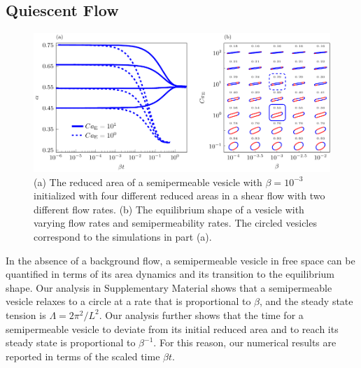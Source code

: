 \documentclass[9pt,twocolumn,twoside,lineno]{pnas-new}
\newif\ifTikz
\begin{document}
\subsection*{Quiescent Flow} 
\begin{figure}[htp]
  \centering
  \ifTikz
  
  \else
  \includegraphics{figures/shearComposite.pdf}
  \fi
  \caption{\label{fig:shearComposite} (a) The reduced area of a
  semipermeable vesicle with $\beta = 10^{-3}$ initialized with four
  different reduced areas in a shear flow with two different flow rates.
  (b) The equilibrium shape of a vesicle with varying flow rates and
  semipermeability rates. The circled vesicles correspond to the
  simulations in part (a).}
\end{figure}
In the absence of a background flow, a semipermeable vesicle in free
space can be quantified in terms of its area dynamics and its transition
to the equilibrium shape. Our analysis in Supplementary Material shows
that a semipermeable vesicle relaxes to a circle at a rate that is
proportional to $\beta$, and the steady state tension is $\Lambda =
2\pi^2/L^2$. Our analysis further shows that the time for a
semipermeable vesicle to deviate from its initial reduced area and to
reach its steady state is proportional to $\beta^{-1}$. For this reason,
our numerical results are reported in terms of the scaled time $\beta
t$.
\end{document}
